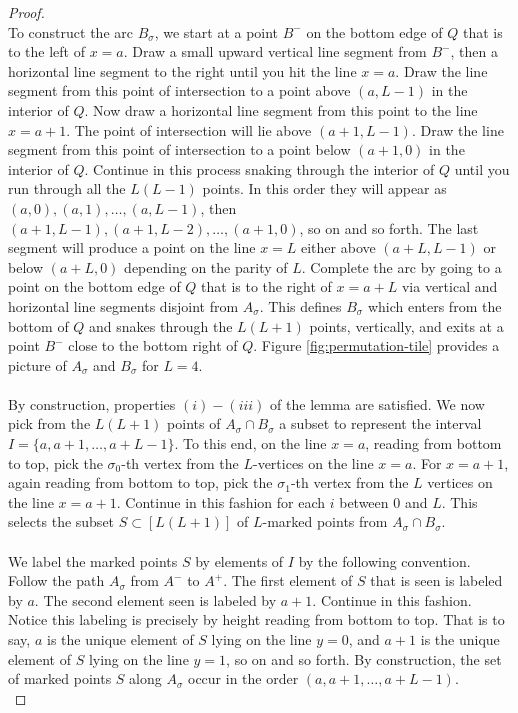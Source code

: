 \documentclass[11pt,a4paper]{amsart}
\theoremstyle{definition}
\theoremstyle{remark}
\begin{document}
\begin{proof}
\\
To construct the arc $B_{\sigma}$, we start at a point $B^{-}$ on the bottom edge of $Q$ that is to the left of $x = a$.  Draw a small upward vertical line segment from $B^{-}$, then a horizontal line segment to the right until you hit the line $x = a$.  Draw the line segment from this point of intersection to a point above $(a,L-1)$ in the interior of $Q$.  Now draw a horizontal line segment from this point to the line $x = a+1$.  The point of intersection will lie above $(a+1,L-1)$.  Draw the line segment from this point of intersection to a point below $(a+1,0)$ in the interior of $Q$.  Continue in this process snaking through the interior of $Q$ until you run through all the $L(L-1)$ points.  In this order they will appear as $(a,0), (a,1), \hdots, (a,L-1)$, then $(a+1,L-1), (a+1,L-2), \hdots, (a+1,0)$, so on and so forth.  The last segment will produce a point on the line $x = L$ either above $(a+L,L-1)$ or below $(a+L,0)$ depending on the parity of $L$.  Complete the arc by going to a point on the bottom edge of $Q$ that is to the right of $x = a+L$ via vertical and horizontal line segments disjoint from $A_{\sigma}$.  This defines $B_{\sigma}$ which enters from the bottom of $Q$ and snakes through the $L(L+1)$ points, vertically, and exits at a point $B^{-}$ close to the bottom right of $Q$.  Figure \ref{fig:permutation-tile} provides a picture of $A_{\sigma}$ and $B_{\sigma}$ for $L = 4$.  \\
\\
By construction, properties $(i) - (iii)$ of the lemma are satisfied.  We now pick from the $L(L+1)$ points of $A_{\sigma} \cap B_{\sigma}$ a subset to represent the interval $I = \{a,a+1,\hdots, a+L-1\}$.  To this end, on the line $x = a$, reading from bottom to top, pick the $\sigma_{0}$-th vertex from the $L$-vertices on the line $x=a$.  For $x=a+1$, again reading from bottom to top, pick the $\sigma_{1}$-th vertex from the $L$ vertices on the line $x = a+1$.  Continue in this fashion for each $i$ between $0$ and $L$.  This selects the subset $S \subset [L(L+1)]$ of $L$-marked points from $A_{\sigma} \cap B_{\sigma}$.  \\
\\
We label the marked points $S$ by elements of $I$ by the following convention.  Follow the path $A_{\sigma}$ from $A^{-}$ to $A^{+}$.  The first element of $S$ that is seen is labeled by $a$.  The second element seen is labeled by $a+1$.  Continue in this fashion.  Notice this labeling is precisely by height reading from bottom to top.  That is to say, $a$ is the unique element of $S$ lying on the line $y = 0$, and $a+1$ is the unique element of $S$ lying on the line $y = 1$, so on and so forth.  By construction, the set of marked points $S$ along $A_{\sigma}$ occur in the order $(a,a+1,\hdots, a+L-1)$.  \\

\end{proof}
\end{document}
